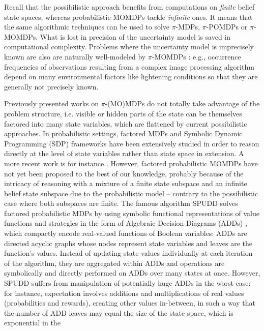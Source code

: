 Recall that the possibilistic approach benefits from computations 
on \emph{finite} belief state spaces, 
whereas probabilistic MOMDPs tackle \emph{infinite} ones. 
It means that the same algorithmic techniques can be used to solve $\pi$-MDPs,
$\pi$-POMDPs or $\pi$-MOMDPs. 
What is lost in precision of the uncertainty model is saved 
in computational complexity. Problems where the uncertainty model is
imprecisely known are also are naturally well-modeled by $\pi$-MOMDPs \cite{Drougard13}: 
e.g., occurrence frequencies of observations resulting from a complex
image processing algorithm depend on many environmental factors like lightening
conditions so that they are generally not precisely known.

Previously presented works on $\pi$-(MO)MDPs do not totally take advantage of
the problem structure, i.e. visible or hidden parts of the state can be
themselves factored into many state variables, which are flattened by
current possibilistic approaches. In probabilistic settings, factored MDPs 
and Symbolic Dynamic Programming (SDP) frameworks
\cite{DBLP:journals/ai/BoutilierDG00,Hoey99spudd:stochastic} have been
extensively studied in order to reason directly at the level of state variables
rather than state space in extension.
A more recent work is for instance \cite{DBLP:conf/ecai/RadoszyckiPS14}. 
However, factored probabilistic
MOMDPs have not yet been proposed to the best of our knowledge, probably because
of the intricacy of reasoning with a mixture of a finite state subspace and an
infinite belief state subspace due to the probabilistic model -- contrary to the
possibilistic case where both subspaces are finite. The famous algorithm SPUDD
\cite{Hoey99spudd:stochastic} solves factored probabilistic MDPs by using
symbolic functional representations of value functions and strategies in the form
of Algebraic Decision Diagrams (ADDs) \cite{Bahar:1997:ADD}, which compactly
encode real-valued functions of Boolean variables: ADDs are directed acyclic
graphs whose nodes represent state variables and leaves are the function's
values. Instead of updating state values individually at each iteration of the
algorithm, they are aggregated within ADDs and operations are symbolically and
directly performed on ADDs over many states at once. However, SPUDD suffers from manipulation of
potentially huge ADDs in the worst case: for instance,
expectation involves additions and multiplications of real values (probabilities
and rewards), creating other values in-between, in such a way that the number of
ADD leaves may equal the size of the state space, which is exponential in the
